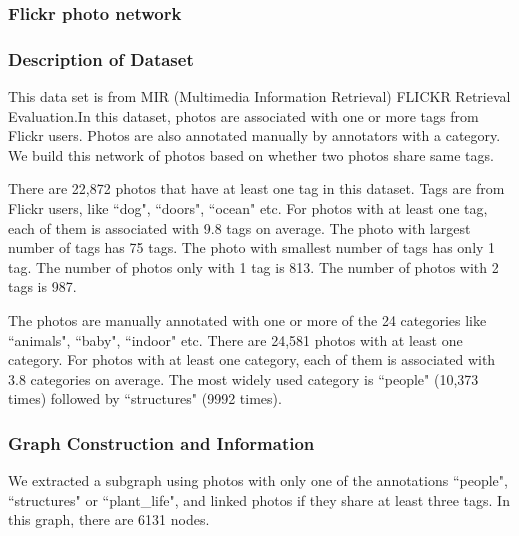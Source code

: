 \subsubsection{Flickr photo network}

\subsubsection*{Description of Dataset}
This data set is from MIR (Multimedia Information Retrieval) FLICKR Retrieval Evaluation.In this dataset, photos are associated with one or more tags from Flickr users. Photos are also annotated manually by annotators with a category. We build this network of photos based on whether two photos share same tags. 

There are 22,872 photos that have at least one tag in this dataset. Tags are from Flickr users, like ``dog", ``doors", ``ocean" etc. For photos with at least one tag, each of them is associated with 9.8 tags on average. The photo with largest number of tags has 75 tags. The photo with smallest number of tags has only 1 tag. The number of photos only with 1 tag is 813. The number of photos with 2 tags is 987.

The photos are manually annotated with one or more of the 24 categories like ``animals", ``baby", ``indoor" etc. There are 24,581 photos with at least one category. For photos with at least one category, each of them is associated with 3.8 categories on average.  The most widely used category is ``people" (10,373 times) followed by ``structures" (9992 times). 

\subsubsection*{Graph Construction and Information}
We extracted a subgraph using photos with only one of the annotations ``people", ``structures" or ``plant\_life", and linked photos if they share at least three tags. In this graph, there are 6131 nodes. 

\begin{table}[!ht]
\centering
{}
\end{table}

